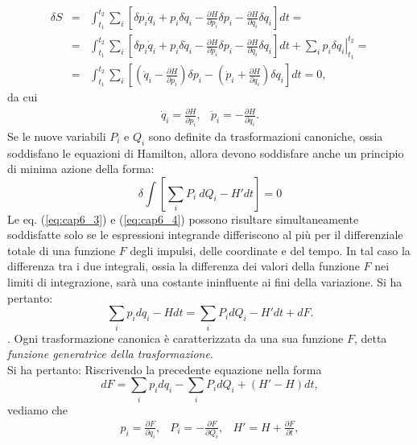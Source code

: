 \documentclass[a4paper,12pt,oneside]{book}
\begin{document}
\begin{eqnarray}
\delta S & =& \int _{t_1} ^{t_2} \sum _i \left[ \delta p_i \dot{q}_i + p_i \delta \dot{q}_i - \frac{\partial H}{\partial p_i} \delta p_i - \frac{\partial H}{\partial q_i}\delta q_i \right] dt = \nonumber \\
&=&\int _{t_1} ^{t_2} \sum _i \left[ \delta p_i \dot{q}_i + p_i \delta \dot{q}_i - \frac{\partial H}{\partial p_i} \delta p_i - \frac{\partial H }{\partial q_i} \delta q_i \right] dt + \left.\sum_i  p_i \delta q_i \right\vert _{t_1} ^{t_2} = \nonumber \\
&=& \int _{t_1} ^{t_2} \sum _i \left[ \left( \dot{q}_i - \frac{\partial H}{\partial p_i} \right) \delta p_i - \left( \dot{p}_i + \frac{\partial H}{\partial q_i}\right)\delta q_i \right] dt = 0 ,
\end{eqnarray}
da cui
\begin{equation}
\begin{matrix}
\dot{q}_i = \frac{\partial H}{\partial p_i} , & \dot{p}_i = - \frac{\partial H}{\partial q_i} .
\end{matrix}
\end{equation}
Se le nuove variabili $P_i$ e $Q_i$ sono definite da trasformazioni canoniche, ossia soddisfano le equazioni di Hamilton, allora devono soddisfare anche un principio di minima azione della forma:
\begin{equation}
\delta \int \left[ \sum_i P_i\ dQ_i - H'dt\right] = 0
\label{eq:cap6_4}
\end{equation}
Le eq. (\ref{eq:cap6_3}) e (\ref{eq:cap6_4}) possono risultare simultaneamente soddisfatte solo se le espressioni integrande differiscono al pi\`u per il differenziale totale di una funzione $F$ degli impulsi, delle coordinate e del tempo. In tal caso la differenza tra i due integrali, ossia la differenza dei valori della funzione $F$ nei limiti di integrazione, sar\`a una costante ininfluente ai fini della variazione. Si ha pertanto:
\begin{equation}
\sum_i p_i dq_i - Hdt = \sum_i P_i d Q_i - H'dt + dF .
\end{equation}.
Ogni trasformazione canonica \`e caratterizzata da una sua funzione $F$, detta \textit{funzione generatrice della trasformazione}.\\
Si ha pertanto:
Riscrivendo la precedente equazione nella forma
\begin{equation}
dF = \sum_i p_i d q_i - \sum_i P_i dQ_i + (H'-H)dt ,
\label{eq:cap6_5}
\end{equation}
vediamo che
\begin{equation}
\begin{matrix}
p_i = \frac{\partial F}{\partial q_i} , & P_i = - \frac{\partial F}{\partial Q_i} , & H' = H + \frac{\partial F}{\partial t} ,
\end{matrix}
\label{o}
\end{equation}
\end{document}
